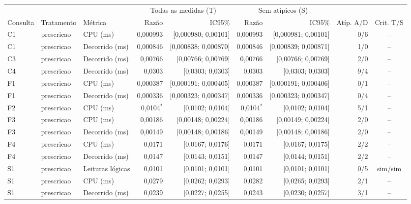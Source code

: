 {\scriptsize\setlength{\tabcolsep}{4pt}
\begin{tabular}{lllrrrrrc}
\toprule
 &  &  & \multicolumn{2}{c}{Todas as medidas (T)} & \multicolumn{2}{c}{Sem atípicos (S)} &  &  \\
\cmidrule(lr){4-5}\cmidrule(lr){6-7}
Consulta & Tratamento & Métrica & Razão & IC95\% & Razão & IC95\% & Atíp. A/D & Crit. T/S \\
\midrule
C1 & prescricao & CPU (ms) & 0,000993 & [0,000980; 0,00101] & 0,000993 & [0,000981; 0,00101] & 0/6 & -- \\
C1 & prescricao & Decorrido (ms) & 0,000846 & [0,000838; 0,000870] & 0,000846 & [0,000839; 0,000871] & 1/0 & -- \\
C3 & prescricao & Decorrido (ms) & 0,00766 & [0,00766; 0,00769] & 0,00766 & [0,00766; 0,00769] & 2/0 & -- \\
C4 & prescricao & Decorrido (ms) & 0,0303 & [0,0303; 0,0303] & 0,0303 & [0,0303; 0,0303] & 9/4 & -- \\
F1 & prescricao & CPU (ms) & 0,000387 & [0,000191; 0,000405] & 0,000387 & [0,000191; 0,000406] & 0/1 & -- \\
F1 & prescricao & Decorrido (ms) & 0,000336 & [0,000323; 0,000347] & 0,000336 & [0,000323; 0,000347] & 0/4 & -- \\
F2 & prescricao & CPU (ms) & 0,0104$^{*}$ & [0,0102; 0,0104] & 0,0104$^{*}$ & [0,0102; 0,0104] & 5/1 & -- \\
F3 & prescricao & CPU (ms) & 0,00186 & [0,00148; 0,00224] & 0,00186 & [0,00149; 0,00224] & 2/0 & -- \\
F3 & prescricao & Decorrido (ms) & 0,00149 & [0,00148; 0,00186] & 0,00149 & [0,00148; 0,00186] & 2/0 & -- \\
F4 & prescricao & CPU (ms) & 0,0171 & [0,0167; 0,0176] & 0,0171 & [0,0167; 0,0175] & 2/2 & -- \\
F4 & prescricao & Decorrido (ms) & 0,0147 & [0,0143; 0,0151] & 0,0147 & [0,0144; 0,0151] & 2/2 & -- \\
S1 & prescricao & Leituras lógicas & 0,0101 & [0,0101; 0,0101] & 0,0101 & [0,0101; 0,0101] & 0/5 & sim/sim \\
S1 & prescricao & CPU (ms) & 0,0279 & [0,0262; 0,0293] & 0,0282 & [0,0265; 0,0293] & 2/1 & -- \\
S1 & prescricao & Decorrido (ms) & 0,0239 & [0,0227; 0,0255] & 0,0243 & [0,0230; 0,0257] & 3/1 & -- \\

\end{tabular}}
